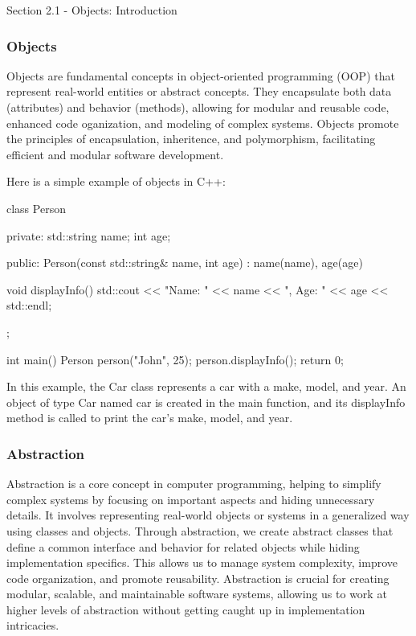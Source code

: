 \begin{notes}{Section 2.1 - Objects: Introduction}
    \subsubsection*{Objects}

    Objects are fundamental concepts in object-oriented programming (OOP) that represent real-world entities or abstract concepts. They encapsulate both data (attributes) and behavior (methods), allowing for modular and reusable
    code, enhanced code oganization, and modeling of complex systems. Objects promote the principles of encapsulation, inheritence, and polymorphism, facilitating efficient and modular software development.
    
    \begin{highlight}
        Here is a simple example of objects in C++:
    \begin{code}[C++]
    class Person {
    private:
        std::string name;
        int age;
    
    public:
        Person(const std::string& name, int age) : name(name), age(age) {}

        void displayInfo() {
            std::cout << "Name: " << name << ", Age: " << age << std::endl;
        }
    };

    int main() {
        Person person("John", 25);
        person.displayInfo();
        return 0;
    }
    \end{code}
        In this example, the Car class represents a car with a make, model, and year. An object of type Car named car is created in the main function, and its displayInfo method is called to print the car's make, model, and year.
    \end{highlight}
    
    \subsubsection*{Abstraction}
    
    Abstraction is a core concept in computer programming, helping to simplify complex systems by focusing on important aspects and hiding unnecessary details. It involves representing real-world objects or systems in a generalized 
    way using classes and objects. Through abstraction, we create abstract classes that define a common interface and behavior for related objects while hiding implementation specifics. This allows us to manage system complexity, 
    improve code organization, and promote reusability. Abstraction is crucial for creating modular, scalable, and maintainable software systems, allowing us to work at higher levels of abstraction without getting caught up in implementation intricacies.
    

\end{notes}
